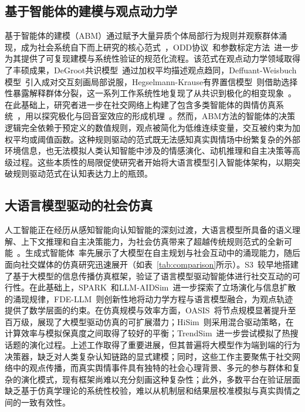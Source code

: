 \documentclass[lettersize,journal]{IEEEtran}
\begin{document}
\subsection{基于智能体的建模与观点动力学}

基于智能体的建模（ABM）通过赋予大量异质个体局部行为规则并观察群体涌现，成为社会系统自下而上研究的核心范式~\cite{bonabeau_agent-based_2002,macal_tutorial_2010}，ODD协议~\cite{grimm_odd_2010}和参数标定方法~\cite{mcculloch_calibrating_2022}进一步为其提供了可复现建模与系统性验证的规范化流程。该范式在观点动力学领域取得了丰硕成果，DeGroot共识模型~\cite{degroot_reaching_1974}通过加权平均描述观点趋同，Deffuant-Weisbuch模型~\cite{deffuant_mixing_2000}引入成对交互刻画局部说服，Hegselmann-Krause有界置信模型~\cite{hegselmann_opinion_2002}则借助选择性暴露解释群体分裂，这一系列工作系统性地复现了从共识到极化的相变现象~\cite{castellano_statistical_2009,bernardo_bc_survey_2024}。在此基础上，研究者进一步在社交网络上构建了包含多类智能体的舆情仿真系统~\cite{chen_evolution_2025,wu_public_2023}，用以探究极化与回音室效应的形成机理~\cite{liu_agent-based_2024,banisch_agent_2012,cinelli_echo_2021}。然而，ABM方法的智能体的决策逻辑完全依赖于预定义的数值规则，观点被简化为低维连续变量，交互被约束为加权平均或阈值函数。这种规则驱动的范式既无法感知真实舆情场中纷繁复杂的外部环境信息，也无法模拟人类认知智能中涉及的情感演化、动机推理和自主决策等高级过程。这些本质性的局限促使研究者开始将大语言模型引入智能体架构，以期突破规则驱动范式在认知表达力上的瓶颈。

\subsection{大语言模型驱动的社会仿真}

人工智能正在经历从感知智能向认知智能的深刻过渡，大语言模型所具备的语义理解、上下文推理和自主决策能力，为社会仿真带来了超越传统规则范式的全新可能~\cite{wang_survey_2024}。生成式智能体~\cite{park_generative_2023}率先展示了大模型在自主规划与社会互动中的涌现能力，随后面向社交媒体的仿真研究迅速展开（如表~\ref{tab:comparison}所示）。S3~\cite{gao_s3_2023}较早地搭建了基于大模型的信息传播仿真框架，验证了语言模型驱动智能体进行社交互动的可行性。在此基础上，SPARK~\cite{zhang_spark_2025}和LLM-AIDSim~\cite{zhang_llm-aidsim_2025,hu_llm-enhanced_2024}进一步探索了立场演化与信息扩散的涌现规律，FDE-LLM~\cite{yao_social_2025}则创新性地将动力学方程与语言模型融合，为观点轨迹提供了数学层面的约束。在仿真规模与效率方面，OASIS~\cite{yang_oasis_2025}将节点规模显著提升至百万级，展现了大模型驱动仿真的可扩展潜力；HiSim~\cite{mou_unveiling_2024}则采用混合驱动策略，在计算效率与模拟保真度之间取得了较好的平衡；TrendSim~\cite{zhang_trendsim_2025}进一步尝试模拟了热搜话题的演化过程。上述工作取得了重要进展，但其普遍将大模型作为端到端的行为决策器，缺乏对人类复杂认知链路的显式建模；同时，这些工作主要聚焦于社交网络中的观点传播，而真实舆情事件具有独特的社会心理背景、多元的参与群体和复杂的演化模式，现有框架尚难以充分刻画这种复杂性；此外，多数平台在验证层面缺乏基于仿真学理论的系统性校验，难以从机制层和结果层校准模拟与真实舆情之间的一致有效性。
\end{document}
